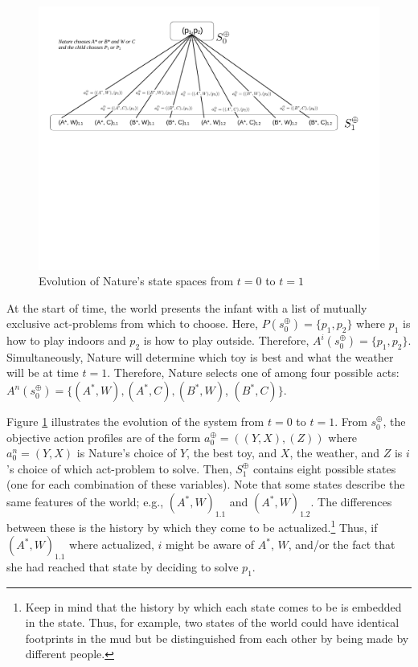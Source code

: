 \documentclass[
11pt,
titlepage,
reqno,
]{article}%
\theoremstyle{definition}
\begin{document}
\begin{figure}[h!]
	\centering
	\includegraphics*[page=1,trim = 0in 4in 0in 0in,scale=.6]{Awareness_Diagrams_All}
	\caption{Evolution of Nature's state spaces from $t=0$ to $t=1$\label{Diag: p-01}}%
\end{figure}

At the start of time, the world presents the infant with a list of mutually exclusive act-problems from which to choose. 
Here, $P(s^\oplus_0)=\{p_1,p_2\}$ where $p_1$ is how to play indoors and $p_2$ is how to play outside.
Therefore, $A^i(s^\oplus_0)=\{p_1,p_2\}$.
Simultaneously, Nature will determine which toy is best and what the weather will be at time $t=1$.
Therefore, Nature selects one of among four possible acts: $A^n(s^\oplus_0)=\{(A^\ast,W),(A^\ast,C),(B^\ast,W)$, $(B^\ast,C)\}$.


Figure \ref{Diag: p-01} illustrates the evolution of the system from $t=0$ to $t=1$. 
From $s^\oplus_0$, the objective action profiles are of the form $a^\oplus_0=((Y,X),(Z))$ where $a^n_0=(Y,X)$ is Nature's choice of  $Y$, the best toy, and $X$, the weather, and $Z$ is $i$'s choice of which act-problem to solve.
Then, $S^\oplus_1$ contains eight possible states (one for each combination of these variables).
Note that some states describe the same features of the world; e.g., $(A^\ast,W)_{1.1}$ and $(A^\ast,W)_{1.2}$. 
The differences between these is the history by which they come to be actualized.\footnote
{
	Keep in mind that the history by which each state comes to be is embedded in the state. 
	Thus, for example, two states of the world could have identical footprints in the mud but be distinguished from each other by being made by different people.
} 
Thus, if $(A^\ast,W)_{1.1}$ where actualized, $i$ might be aware of $A^\ast$, $W$, and/or the fact that she had reached that state by deciding to solve $p_1$.
\end{document}
